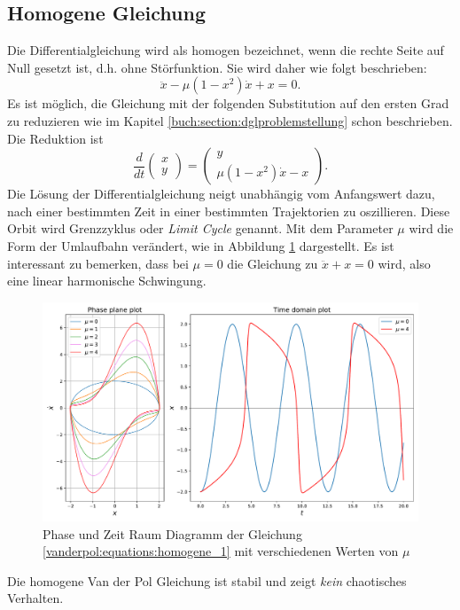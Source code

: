 \subsection{Homogene Gleichung
\label{vanderpol:subsection:homogene}}
Die Differentialgleichung wird als homogen bezeichnet, wenn die rechte Seite auf Null gesetzt ist, d.h. ohne Störfunktion. Sie wird daher wie folgt beschrieben:
\begin{equation}
	\ddot{x} - \mu \left(1-x^{2}\right)\dot{x}+x = 0.
\label{vanderpol:equations:homogene}
\end{equation}
Es ist möglich, die Gleichung mit der folgenden Substitution auf den ersten Grad zu reduzieren wie im Kapitel \ref{buch:section:dglproblemstellung} schon beschrieben. Die Reduktion ist
\begin{equation}
\frac{d}{dt}\begin{pmatrix}x \\ y\end{pmatrix} = \begin{pmatrix}y \\ \mu \left(1-x^{2}\right)\dot{x}-x\end{pmatrix}.
\label{vanderpol:equations:homogene_1}
\end{equation}
Die Lösung der Differentialgleichung neigt unabhängig vom Anfangswert dazu, nach einer bestimmten Zeit in einer bestimmten Trajektorien zu oszillieren. Diese Orbit wird Grenzzyklus oder {\em Limit Cycle} genannt. Mit dem Parameter $\mu$ wird die Form der Umlaufbahn verändert, wie in Abbildung \ref{vanderpol:figures:homogene} dargestellt. Es ist interessant zu bemerken, dass bei $\mu = 0$ die Gleichung zu $\ddot{x} + x = 0$ wird, also eine linear harmonische Schwingung.
\begin{figure}
	\centering
	\includegraphics[width=\textwidth]{papers/vanderpol/figures/homogene_plot.pdf}
	\caption{Phase und Zeit Raum Diagramm der Gleichung \eqref{vanderpol:equations:homogene_1} mit verschiedenen Werten von $\mu$\label{vanderpol:figures:homogene}}
\end{figure}
Die homogene Van der Pol Gleichung ist stabil und zeigt {\em kein} chaotisches Verhalten.
